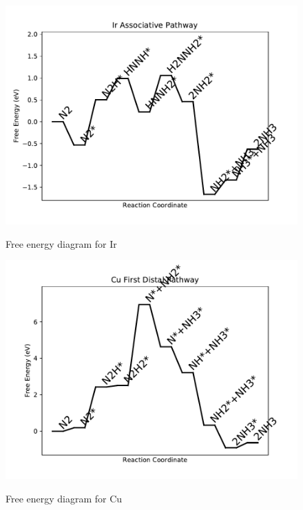 \documentclass{article}
\begin{document}
\begin{figure}
\includegraphics[width=1\linewidth]{data/plots/Ir_associative.pdf}
\label{fig:Ir_associative}
\caption{Free energy diagram for Ir}
\end{figure}

\clearpage
\begin{figure}
\includegraphics[width=1\linewidth]{data/plots/Cu_distal_1.pdf}
\label{fig:Cu_distal_1}
\caption{Free energy diagram for Cu}
\end{figure}
\end{document}
